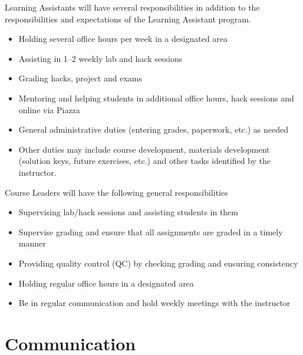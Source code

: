\documentclass[12pt]{scrartcl}
\begin{document}
Learning Assistants will have several responsibilities in addition to the
responsibilities and expectations of the Learning Assistant program.

\begin{itemize}
  \item Holding several office hours per week in a designated area
  \item Assisting in 1--2 weekly lab and hack sessions
  \item Grading hacks, project and exams
  \item Mentoring and helping students in additional office hours, hack sessions
  and online via Piazza
  \item General administrative duties (entering grades, paperwork, etc.) as needed
  \item Other duties may include course development, materials development 
  (solution keys, future exercises, etc.) and other tasks identified by the instructor.
\end{itemize}

Course Leaders will have the following general responsibilities
\begin{itemize}
  \item Supervising lab/hack sessions and assisting students in them
  \item Supervise grading and ensure that all assignments are graded 
    in a timely manner
  \item Providing quality control (QC) by checking grading and ensuring consistency
  \item Holding regular office hours in a designated area
  \item Be in regular communication and hold weekly meetings with the instructor
\end{itemize}


\section*{Communication}
\end{document}
